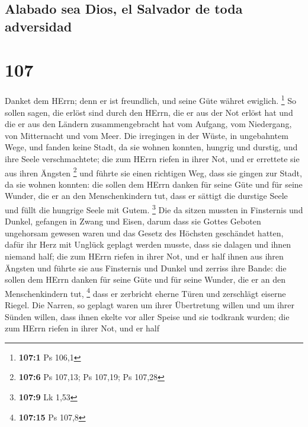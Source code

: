 \hypertarget{alabado-sea-dios-el-salvador-de-toda-adversidad}{%
\subsection{Alabado sea Dios, el Salvador de toda
adversidad}\label{alabado-sea-dios-el-salvador-de-toda-adversidad}}

\hypertarget{section-106}{%
\section{107}\label{section-106}}

 Danket dem HErrn; denn er ist freundlich, und seine Güte
währet ewiglich. \footnote{\textbf{107:1} Ps 106,1}  So
sollen sagen, die erlöst sind durch den HErrn, die er aus der Not erlöst
hat  und die er aus den Ländern zusammengebracht hat vom
Aufgang, vom Niedergang, von Mitternacht und vom Meer. 
Die irregingen in der Wüste, in ungebahntem Wege, und fanden keine
Stadt, da sie wohnen konnten,  hungrig und durstig, und
ihre Seele verschmachtete;  die zum HErrn riefen in ihrer
Not, und er errettete sie aus ihren Ängsten \footnote{\textbf{107:6} Ps
  107,13; Ps 107,19; Ps 107,28}  und führte sie einen
richtigen Weg, dass sie gingen zur Stadt, da sie wohnen konnten:
 die sollen dem HErrn danken für seine Güte und für seine
Wunder, die er an den Menschenkindern tut,  dass er
sättigt die durstige Seele und füllt die hungrige Seele mit Gutem.
\footnote{\textbf{107:9} Lk 1,53}  Die da sitzen mussten
in Finsternis und Dunkel, gefangen in Zwang und Eisen, 
darum dass sie Gottes Geboten ungehorsam gewesen waren und das Gesetz
des Höchsten geschändet hatten,  dafür ihr Herz mit
Unglück geplagt werden musste, dass sie dalagen und ihnen niemand half;
 die zum HErrn riefen in ihrer Not, und er half ihnen aus
ihren Ängsten  und führte sie aus Finsternis und Dunkel
und zerriss ihre Bande:  die sollen dem HErrn danken für
seine Güte und für seine Wunder, die er an den Menschenkindern tut,
\footnote{\textbf{107:15} Ps 107,8}  dass er zerbricht
eherne Türen und zerschlägt eiserne Riegel.  Die Narren,
so geplagt waren um ihrer Übertretung willen und um ihrer Sünden willen,
 dass ihnen ekelte vor aller Speise und sie todkrank
wurden;  die zum HErrn riefen in ihrer Not, und er half
